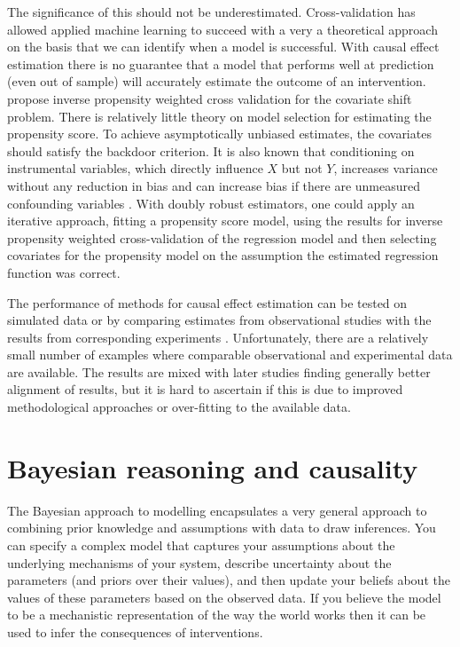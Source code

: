 \documentclass[11pt,a4paper,twoside]{report}
\theoremstyle{plain}
\theoremstyle{definition}
\begin{document}
The significance of this should not be underestimated. Cross-validation has allowed applied machine learning to succeed with a very a theoretical approach on the basis that we can identify when a model is successful. With causal effect estimation there is no guarantee that a model that performs well at prediction (even out of sample) will accurately estimate the outcome of an intervention. \citet{Sugiyama2007} propose inverse propensity weighted cross validation for the covariate shift problem. There is relatively little theory on model selection for estimating the propensity score. To achieve asymptotically unbiased estimates, the covariates should satisfy the backdoor criterion. It is also known that conditioning on instrumental variables, which directly influence $X$ but not $Y$, increases variance without any reduction in bias and can increase bias if there are unmeasured confounding variables \citep{Wooldridge2009,Bhattacharya2012,Pearl2012b,Myers2011}. With doubly robust estimators, one could apply an iterative approach, fitting a propensity score model, using the results for inverse propensity weighted cross-validation of the regression model and then selecting covariates for the propensity model on the assumption the estimated regression function was correct.

The performance of methods for causal effect estimation can be tested on simulated data \citep{Frolich2001,zhao2004using,Hill2011,Dorie2016} or by comparing estimates from observational studies with the results from corresponding experiments \citep{lalonde1986evaluating,Fraker1987,heckman1997matching,heckman1998characterizing,dehejia1999causal,Smith2001,Anglemyer2014}. Unfortunately, there are a relatively small number of examples where comparable observational and experimental data are available. The results are mixed with later studies finding generally better alignment of results, but it is hard to ascertain if this is due to improved methodological approaches or over-fitting to the available data.  

\section{Bayesian reasoning and causality}
\label{sec:bayesian_causality}
The Bayesian approach to modelling encapsulates a very general approach to combining prior knowledge and assumptions with data to draw inferences. You can specify a complex model that captures your assumptions about the underlying mechanisms of your system, describe uncertainty about the parameters (and priors over their values), and then update your beliefs about the values of these parameters based on the observed data. If you believe the model to be a mechanistic representation of the way the world works then it can be used to infer the consequences of interventions.
\end{document}
